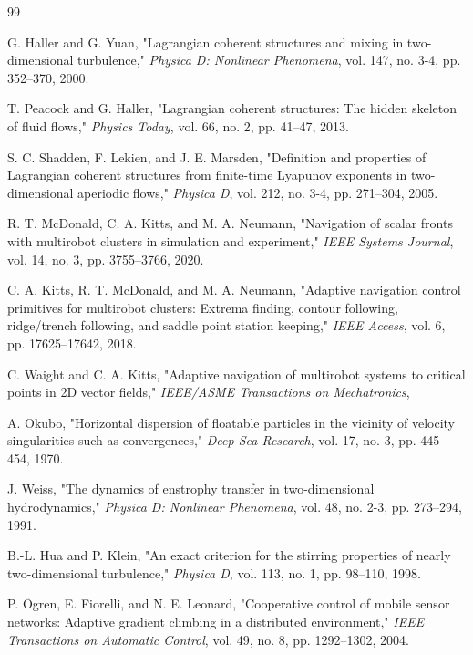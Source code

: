 \documentclass[lettersize,journal]{IEEEtran}
\begin{document}
\begin{thebibliography}{99}

 G. Haller and G. Yuan, "Lagrangian coherent structures and mixing
in two-dimensional turbulence," \textit{Physica D: Nonlinear Phenomena},
vol. 147, no. 3-4, pp. 352--370, 2000.

 T. Peacock and G. Haller, "Lagrangian coherent structures: The
hidden skeleton of fluid flows," \textit{Physics Today}, vol. 66, no. 2,
pp. 41--47, 2013.

 S. C. Shadden, F. Lekien, and J. E. Marsden, "Definition and
properties of Lagrangian coherent structures from finite-time Lyapunov
exponents in two-dimensional aperiodic flows," \textit{Physica D}, vol. 212,
no. 3-4, pp. 271--304, 2005.

 R. T. McDonald, C. A. Kitts, and M. A. Neumann, "Navigation of
scalar fronts with multirobot clusters in simulation and experiment,"
\textit{IEEE Systems Journal}, vol. 14, no. 3, pp. 3755--3766, 2020.

 C. A. Kitts, R. T. McDonald, and M. A. Neumann, "Adaptive
navigation control primitives for multirobot clusters: Extrema finding,
contour following, ridge/trench following, and saddle point station keeping,"
\textit{IEEE Access}, vol. 6, pp. 17625--17642, 2018.

 C. Waight and C. A. Kitts, "Adaptive navigation of multirobot
systems to critical points in 2D vector fields," \textit{IEEE/ASME Transactions
on Mechatronics}, %

 A. Okubo, "Horizontal dispersion of floatable particles in the
vicinity of velocity singularities such as convergences," \textit{Deep-Sea
Research}, vol. 17, no. 3, pp. 445--454, 1970.

 J. Weiss, "The dynamics of enstrophy transfer in two-dimensional
hydrodynamics," \textit{Physica D: Nonlinear Phenomena}, vol. 48, no. 2-3,
pp. 273--294, 1991.

 B.-L. Hua and P. Klein, "An exact criterion for the stirring
properties of nearly two-dimensional turbulence," \textit{Physica D}, vol. 113,
no. 1, pp. 98--110, 1998.

 P. Ögren, E. Fiorelli, and N. E. Leonard, "Cooperative control
of mobile sensor networks: Adaptive gradient climbing in a distributed
environment," \textit{IEEE Transactions on Automatic Control}, vol. 49, no. 8,
pp. 1292--1302, 2004.


\end{thebibliography}
\end{document}
